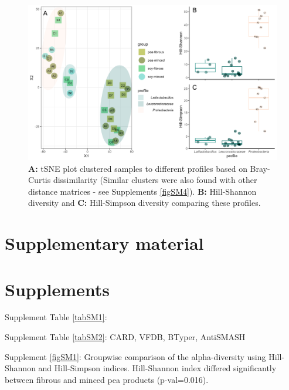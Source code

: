 \documentclass[preprint,3p,
a4paper]{elsarticle} %
\newcommand{\beginsupplement}{ \setcounter{table}{0} \renewcommand{\thetable}{S\arabic{table}} \setcounter{figure}{0} \renewcommand{\thefigure}{S\arabic{figure}} }
\begin{document}
\begin{figure}

{\centering \includegraphics[width=1\linewidth]{Fig3profiles} 

}

\caption{\label{fig3} \textbf {A:} tSNE plot clustered samples to different profiles based on Bray-Curtis dissimilarity (Similar clusters were also found with other distance matrices - see Supplements \ref{figSM4}). \textbf {B:} Hill-Shannon diversity and \textbf {C:} Hill-Simpson diversity comparing these profiles. }\label{fig:fig3}
\end{figure}

\newpage

\hypertarget{supplementary-material}{%
\section*{Supplementary material}\label{supplementary-material}}

\beginsupplement

\hypertarget{supplements}{%
\section{Supplements}\label{supplements}}

Supplement Table \ref{tabSM1}:

Supplement Table \ref{tabSM2}: CARD, VFDB, BTyper, AntiSMASH

Supplement \ref{figSM1}: Groupwise comparison of the alpha-diversity
using Hill-Shannon and Hill-Simpson indices. Hill-Shannon index differed
significantly between fibrous and minced pea products (p-val=0.016).
\end{document}
